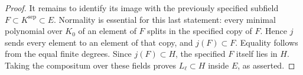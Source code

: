 \begin{proof}
It remains to identify its image with the previously specified
subfield $F\subset K^{\mathrm{sep}}\subset E$. Normality is
essential for this last statement: every minimal polynomial
over $K_0$ of an element of $F$ splits in the specified copy
of $F$. Hence $j$ sends every element to an element of that
copy, and $j(F)\subset F$. Equality follows from the equal
finite degrees. Since $j(F)\subset H$, the specified $F$
itself lies in $H$. Taking the compositum over these fields
proves $L_\ell\subset H$ inside $E$, as asserted.
\end{proof}
